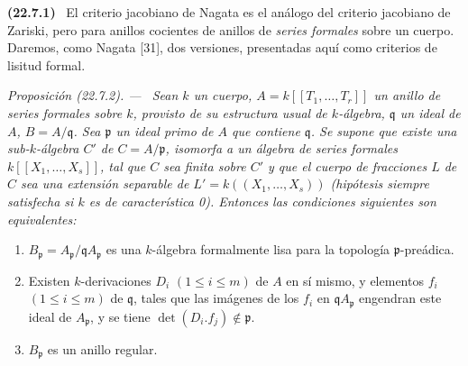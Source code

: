 \documentclass[10pt,oneside]{book}
\makeatletter
\newcommand{\setmanualcurrentlabel}[1]{\def\@currentlabel{#1}}
\newenvironment{env}[1][]{\setmanualcurrentlabel{#1}\par\medskip\noindent\textbf{(#1)}\ }{\par}
\newenvironment{proposition}[1][]{%
  \setmanualcurrentlabel{#1}\par\medskip\noindent\itshape Proposición (#1). ---\ }{\par}
\makeatother
\begin{document}
\begin{env}[22.7.1]
\label{0.22.7.1-es}
El criterio jacobiano de Nagata es el análogo del criterio jacobiano de Zariski,
pero para anillos cocientes de anillos de \emph{series formales} sobre un
cuerpo. Daremos, como Nagata [31], dos versiones, presentadas aquí
como criterios de lisitud formal.
\end{env}

\begin{proposition}[22.7.2]
\label{0.22.7.2-es}
Sean $k$ un cuerpo, $A=k[[T_1,\ldots,T_r]]$ un anillo de series formales sobre
$k$, provisto de su estructura usual de $k$-álgebra, $\mathfrak q$ un ideal de
$A$, $B=A/\mathfrak q$. Sea $\mathfrak p$ un ideal primo de $A$ que contiene
$\mathfrak q$. Se supone que existe una sub-$k$-álgebra $C'$ de
$C=A/\mathfrak p$, isomorfa a un álgebra de series formales
$k[[X_1,\ldots,X_s]]$, tal que $C$ sea finita sobre $C'$ y que el cuerpo de
fracciones $L$ de $C$ sea una extensión separable de
$L'=k((X_1,\ldots,X_s))$ \textup{(hipótesis siempre satisfecha si $k$ es de
característica 0)}. Entonces las condiciones siguientes son equivalentes:
\begin{enumerate}
  \item[\textup{a)}] $B_{\mathfrak p}=A_{\mathfrak p}/\mathfrak qA_{\mathfrak p}$ es
  una $k$-álgebra formalmente lisa para la topología
  $\mathfrak p$-preádica.
  \item[\textup{b)}] Existen $k$-derivaciones $D_i$ $(1\leq i\leq m)$ de $A$ en
  sí mismo, y elementos $f_i$ $(1\leq i\leq m)$ de $\mathfrak q$, tales
  que las imágenes de los $f_i$ en $\mathfrak qA_{\mathfrak p}$ engendran este
  ideal de $A_{\mathfrak p}$, y se tiene
  $\det(D_i.f_j)\notin\mathfrak p$.
  \item[\textup{c)}] $B_{\mathfrak p}$ es un anillo regular.
\end{enumerate}
\end{proposition}
\end{document}

